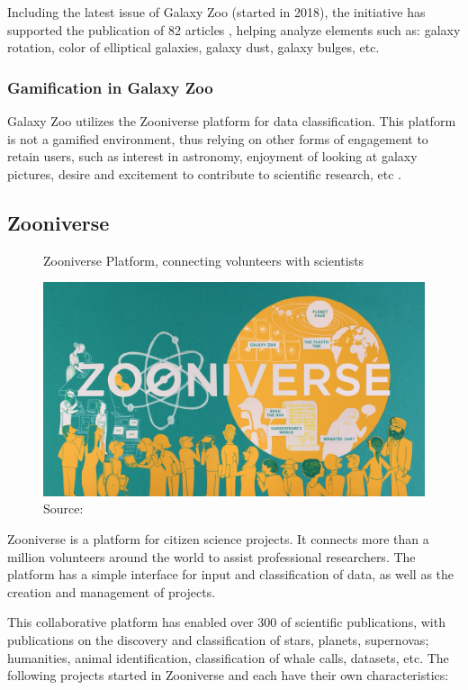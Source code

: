 Including the latest issue of Galaxy Zoo (started in 2018), the initiative has supported the publication of 82 articles \cite{galaxyzoo2021publications}, helping analyze elements such as: galaxy rotation, color of elliptical galaxies, galaxy dust, galaxy bulges, etc.

\subsubsection{Gamification in Galaxy Zoo}

Galaxy Zoo utilizes the Zooniverse platform for data classification. This platform is not a gamified environment, thus relying on other forms of engagement to retain users, such as interest in astronomy, enjoyment of looking at galaxy pictures, desire and excitement to contribute to scientific research, etc \cite{raddick2009galaxy}.

\subsection{Zooniverse}

\begin{figure}[ht]
    \centering
    \caption{Zooniverse Platform, connecting volunteers with scientists}
    \includegraphics[width=0.7\linewidth]{images/background/zooniverse.jpg}
    \caption*{Source: \cite{zooniverse-logo}}
    \label{fig:foldit-solution}
\end{figure}

Zooniverse is a platform for citizen science projects. It connects more than a million volunteers around the world to assist professional researchers. The platform has a simple interface for input and classification of data, as well as the creation and management of projects.

This collaborative platform has enabled over 300 of scientific publications, with publications on the discovery and classification of stars, planets, supernovas; humanities, animal identification, classification of whale calls, datasets, etc. The following projects started in Zooniverse and each have their own characteristics:

